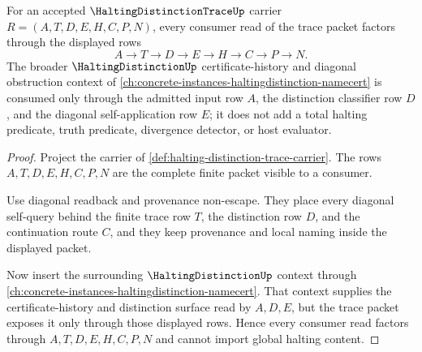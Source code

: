 \begin{theorem}
\label{thm:halting-distinction-trace-scoped-consumer-factorization}
For an accepted $\HaltingDistinctionTraceUp$ carrier $R=(A,T,D,E,H,C,P,N)$, every consumer read of the trace packet factors through the displayed rows
$$
A \to T \to D \to E \to H \to C \to P \to N.
$$
The broader $\HaltingDistinctionUp$ certificate-history and diagonal obstruction context of \autoref{ch:concrete-instances-haltingdistinction-namecert} is consumed only through the admitted input row $A$, the distinction classifier row $D$, and the diagonal self-application row $E$; it does not add a total halting predicate, truth predicate, divergence detector, or host evaluator.
\end{theorem}
\begin{proof}
Project the carrier of \autoref{def:halting-distinction-trace-carrier}. The rows $A,T,D,E,H,C,P,N$ are the complete finite packet visible to a consumer.

Use diagonal readback and provenance non-escape. They place every diagonal self-query behind the finite trace row $T$, the distinction row $D$, and the continuation route $C$, and they keep provenance and local naming inside the displayed packet.

Now insert the surrounding $\HaltingDistinctionUp$ context through \autoref{ch:concrete-instances-haltingdistinction-namecert}. That context supplies the certificate-history and distinction surface read by $A,D,E$, but the trace packet exposes it only through those displayed rows. Hence every consumer read factors through $A,T,D,E,H,C,P,N$ and cannot import global halting content.
\end{proof}


